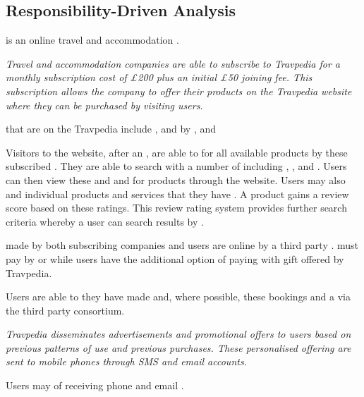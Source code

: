 \subsection{Responsibility-Driven Analysis }

 is an online travel and accommodation .

\emph{Travel and accommodation companies are able to subscribe to Travpedia for
	a monthly subscription cost of £200 plus an initial £50 joining fee. This
	subscription allows the company to offer their products on the Travpedia
website where they can be purchased by visiting users.}

 that are  on the Travpedia 
include ,  and  by
,  and 

Visitors to the website, after  an , are able
to  for all available products  by these
subscribed . They are able to search with a number of
 including , ,
 and . Users can then view these  and  and  for products through the website.
Users may also  and  individual products and services
that they have . A product gains a review score based on
these ratings. This review rating system provides further search criteria
whereby a user can  search results by .

 made by both subscribing companies and users are
 online by a third party .
 must pay by  or  while
users have the additional option of paying with gift  offered
by Travpedia.

Users are able to  they have made and, where
possible,  these bookings and  a 
via the third party consortium.

\emph{Travpedia disseminates advertisements and promotional offers to users
	based on previous patterns of use and previous purchases.  These personalised
offering are sent to mobile phones through SMS and email accounts.}

Users may  of receiving phone and email .

